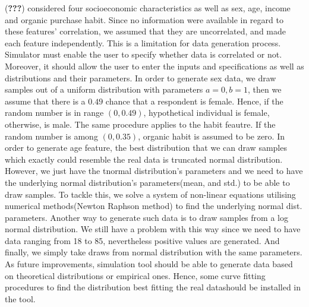 \documentclass[11pt,]{article}
\begin{document}
({\textbf{???}}) considered four socioeconomic characteristics as well
as sex, age, income and organic purchase habit. Since no information
were available in regard to these features' correlation, we assumed that
they are uncorrelated, and made each feature independently. This is a
limitation for data generation process. Simulator must enable the user
to specify whether data is correlated or not. Moreover, it should allow
the user to enter the inputs and specifications as well as distributions
and their parameters. In order to generate sex data, we draw samples out
of a uniform distribution with parameters \(a=0,b=1\), then we assume
that there is a \(0.49\) chance that a respondent is female. Hence, if
the random number is in range \((0,0.49)\), hypothetical individual is
female, otherwise, is male. The same procedure applies to the habit
feautre. If the random number is among \((0,0.35)\), organic habit is
assumed to be zero. In order to generate age feature, the best
distribution that we can draw samples which exactly could resemble the
real data is truncated normal distribution. However, we just have the
tnormal distribution's parameters and we need to have the underlying
normal distribution's parameters(mean, and std.) to be able to draw
samples. To tackle this, we solve a system of non-linear equations
utilising numerical methods(Newton Raphson method) to find the
underlying normal dist. parameters. Another way to generate such data is
to draw samples from a log normal distribution. We still have a problem
with this way since we need to have data ranging from 18 to 85,
nevertheless positive values are generated. And finally, we simply take
draws from normal distribution with the same parameters. As future
improvements, simulation tool should be able to generate data based on
theoretical distributions or empirical ones. Hence, some curve fitting
procedures to find the distribution best fitting the real datashould be
installed in the tool.
\end{document}
